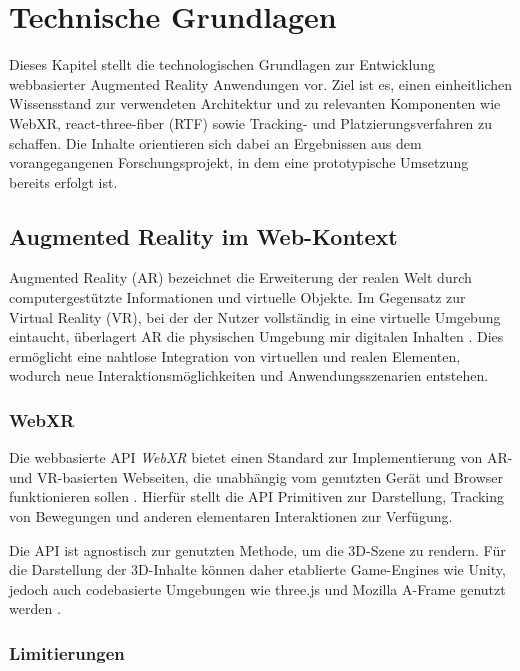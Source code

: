 \section{Technische Grundlagen}\label{section:Technische Grundlagen}

Dieses Kapitel stellt die technologischen Grundlagen zur Entwicklung webbasierter Augmented Reality Anwendungen vor. Ziel ist es, einen einheitlichen Wissensstand zur verwendeten Architektur und zu relevanten Komponenten wie WebXR, react-three-fiber (RTF) sowie Tracking- und Platzierungsverfahren zu schaffen. Die Inhalte orientieren sich dabei an Ergebnissen aus dem vorangegangenen Forschungsprojekt, in dem eine prototypische Umsetzung bereits erfolgt ist.

\subsection{Augmented Reality im Web-Kontext}

Augmented Reality (AR) bezeichnet die Erweiterung der realen Welt durch computergestützte Informationen und virtuelle Objekte. Im Gegensatz zur Virtual Reality (VR), bei der der Nutzer vollständig in eine virtuelle Umgebung eintaucht, überlagert AR die physischen Umgebung mir digitalen Inhalten \parencite{azumaSurveyAugmentedReality1997}. Dies ermöglicht eine nahtlose Integration von virtuellen und realen Elementen, wodurch neue Interaktionsmöglichkeiten und Anwendungsszenarien entstehen.

\subsubsection{WebXR}

Die webbasierte API \textit{WebXR} bietet einen Standard zur Implementierung von AR- und VR-basierten Webseiten, die unabhängig vom genutzten Gerät und Browser funktionieren sollen \parencite{w3cWebxrExplainermdMaster2024}. Hierfür stellt die API Primitiven zur Darstellung, Tracking von Bewegungen und anderen elementaren Interaktionen zur Verfügung.

Die API ist agnostisch zur genutzten Methode, um die 3D-Szene zu rendern. Für die Darstellung der 3D-Inhalte können daher etablierte Game-Engines wie Unity, jedoch auch codebasierte Umgebungen wie three.js und Mozilla A-Frame genutzt werden \parencite{weizmanDePantherUnitywebxrexport2024}.

\subsubsection{Limitierungen}

